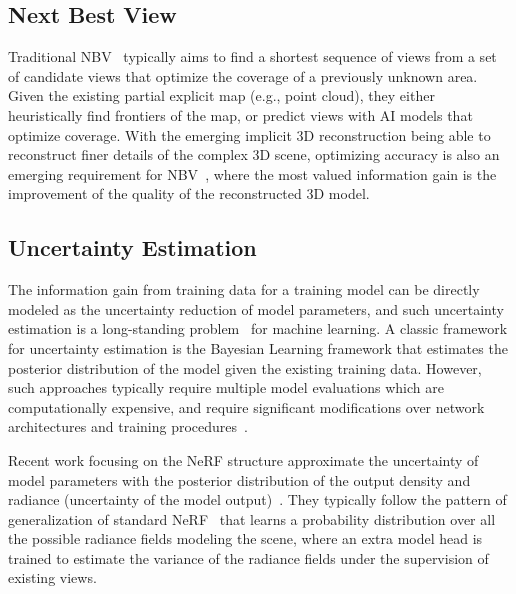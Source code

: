 \subsection{Next Best View}
Traditional NBV~\cite{Biss_NBV,guedon_scone_2022,1087372} typically aims to find a shortest sequence of views from a set of candidate views that optimize the coverage of a previously unknown area.
Given the existing partial explicit map (e.g., point cloud), they either heuristically find frontiers of the map, or predict views with AI models that optimize coverage.
With the emerging implicit 3D reconstruction being able to reconstruct finer details of the complex 3D scene, optimizing accuracy is also an emerging requirement for NBV~\cite{avidan_activenerf_2022,jin_neu-nbv_2023,ran_neurar_2023,shen_stochastic_2021}, where the most valued information gain is the improvement of the quality of the reconstructed 3D model.

\subsection{Uncertainty Estimation}
The information gain from training data for a training model can be directly modeled as the uncertainty reduction of model parameters, and such uncertainty estimation is a long-standing problem~\cite{ABDAR2021243,gal2016dropout,lakshminarayanan2017simple,maddox_simple_2019,tran_bayesian_2019,bissiri_general_2016} for machine learning.
A classic framework for uncertainty estimation is the Bayesian Learning framework that estimates the posterior distribution of the model given the existing training data.
However, such approaches typically require multiple model evaluations which are computationally expensive, and require significant modifications over network architectures and training procedures~\cite{shen_stochastic_2021,tran_bayesian_2019}.

Recent work focusing on the NeRF structure approximate the uncertainty of model parameters with the posterior distribution of the output density and radiance (uncertainty of the model output)~\cite{shen_stochastic_2021,avidan_activenerf_2022,ran_neurar_2023,jin_neu-nbv_2023}.
They typically follow the pattern of generalization of standard NeRF~\cite{shen_stochastic_2021} that learns a probability distribution over all the possible radiance fields modeling the scene, 
where an extra model head is trained to estimate the variance of the radiance fields under the supervision of existing views.

